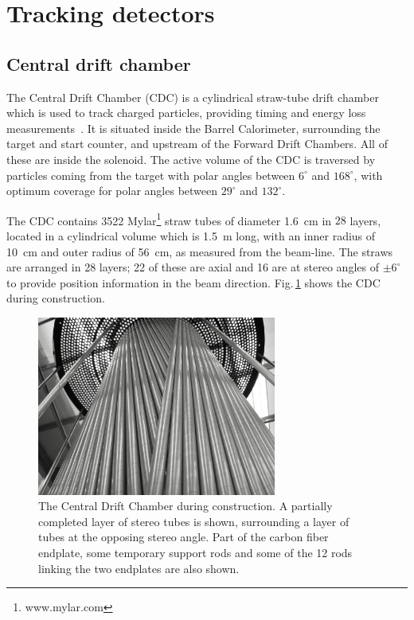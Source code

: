 \section{Tracking detectors \label{sec:tracking}}
\subsection[Central drift chamber (Naomi)]{Central drift chamber \label{sec:cdc}}

The Central Drift Chamber (CDC) is a cylindrical straw-tube drift chamber which is used to track charged particles, providing timing and energy loss measurements~\cite{GlueXCDCNIM}.
It is situated inside the Barrel Calorimeter, surrounding the target and start counter, and upstream of the Forward Drift Chambers. 
All of these are inside the solenoid. 
The active volume of the CDC is traversed
by particles coming from the target with polar angles between $6^{\circ}$ and $168^{\circ}$, with optimum 
coverage for polar angles between $29^{\circ}$ and $132^{\circ}$.  

The CDC contains 3522 Mylar\footnote{www.mylar.com} straw tubes of diameter 1.6~cm in $28$ layers,
located in a cylindrical volume which is 1.5~m long, with an inner radius of 10~cm and outer radius of 56~cm, as measured from the beam-line.  
The straws are arranged in 28 layers; 22 of these are axial and 16 are at stereo angles of $\pm 6^{\circ}$ to provide position information in the beam direction. Fig.\,\ref{fig:CDC_stereotubes}  shows the CDC during construction. 

\begin{figure}[tbp]
\begin{center}
\includegraphics[width=0.7\textwidth]{figures/CDC_stereotubes}  
\caption{\label{fig:CDC_stereotubes}          
  The Central Drift Chamber during construction. A partially completed layer of stereo tubes is shown, surrounding a layer of tubes at the opposing stereo angle. Part of the carbon fiber endplate, some temporary support rods and some of the 12 rods linking the two endplates are also shown.}  
\end{center}
\end{figure}

